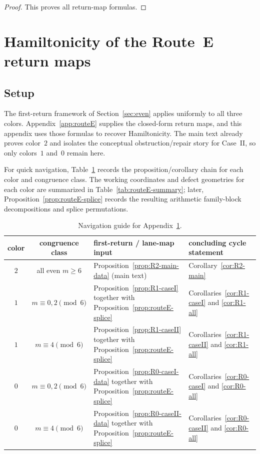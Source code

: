 \documentclass[11pt]{article}
\begin{document}
\begin{proof}
This proves all return-map formulas.
\end{proof}

\section{Hamiltonicity of the Route~E return maps}\label{app:routeE-cycle}

\subsection{Setup}

The first-return framework of Section~\ref{sec:even} applies uniformly to all three colors.
Appendix~\ref{app:routeE} supplies the closed-form return maps, and this appendix uses those formulas to recover Hamiltonicity.
The main text already proves color~$2$ and isolates the conceptual obstruction/repair story for Case~II, so only colors~$1$ and~$0$ remain here.

For quick navigation, Table~\ref{tab:appendix-cycle-guide} records the proposition/corollary chain for each color and congruence class.
The working coordinates and defect geometries for each color are summarized in Table~\ref{tab:routeE-summary}; later, Proposition~\ref{prop:routeE-splice} records the resulting arithmetic family-block decompositions and splice permutations.

\begin{table}[H]
\centering
\footnotesize
\renewcommand{\arraystretch}{1.15}
\begin{tabularx}{\textwidth}{@{}c c >{\raggedright\arraybackslash}X >{\raggedright\arraybackslash}X@{}}
\toprule
color & congruence class & first-return / lane-map input & concluding cycle statement \\
\midrule
$2$ & all even $m\ge 6$ & Proposition~\ref{prop:R2-main-data} (main text) & Corollary~\ref{cor:R2-main} \\
$1$ & $m\equiv 0,2\pmod 6$ & Proposition~\ref{prop:R1-caseI} together with Proposition~\ref{prop:routeE-splice} & Corollaries~\ref{cor:R1-caseI} and \ref{cor:R1-all} \\
$1$ & $m\equiv 4\pmod 6$ & Proposition~\ref{prop:R1-caseII} together with Proposition~\ref{prop:routeE-splice} & Corollaries~\ref{cor:R1-caseII} and \ref{cor:R1-all} \\
$0$ & $m\equiv 0,2\pmod 6$ & Proposition~\ref{prop:R0-caseI-data} together with Proposition~\ref{prop:routeE-splice} & Corollaries~\ref{cor:R0-caseI} and \ref{cor:R0-all} \\
$0$ & $m\equiv 4\pmod 6$ & Proposition~\ref{prop:R0-caseII-data} together with Proposition~\ref{prop:routeE-splice} & Corollaries~\ref{cor:R0-caseII} and \ref{cor:R0-all} \\
\bottomrule
\end{tabularx}
\caption{Navigation guide for Appendix~\ref{app:routeE-cycle}.}
\label{tab:appendix-cycle-guide}
\end{table}
\end{document}
